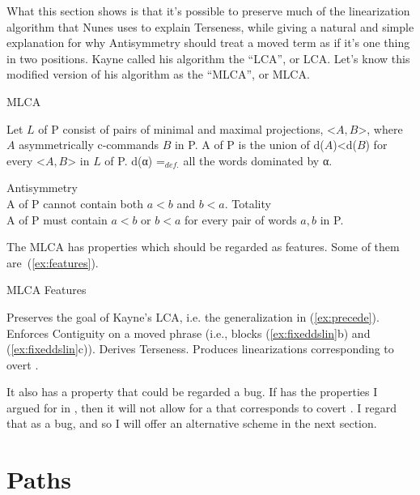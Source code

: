 \documentclass[output=paper]{langsci/langscibook}
\begin{document}
What this section shows is that it's possible to preserve much of the
linearization algorithm that Nunes uses to explain Terseness, while giving a
natural and simple explanation for why Antisymmetry should treat a moved term
as if it's one thing in two positions. Kayne called his  algorithm
the \enquote{\glsdesc{LCA}}, or \gls{LCA}. Let's know this modified
version of his algorithm as the \enquote{\glsdesc{MLCA}}, or
\gls{MLCA}.

\begin{exe}
    \ex \label{ex:mlca} \gls{MLCA}
	\begin{xlist}
		\ex Let $L$ of P consist of pairs of minimal and maximal projections, <$A,B$>, where $A$ asymmetrically c-commands $B$ in P.
		\ex A  of P is the union of d($A$)<d($B$) for every <$A,B$> in $L$ of P.
        \ex d(α) =$_{def.}$ all the words dominated by α.
	\end{xlist}
	\ex Antisymmetry\\
	A  of P cannot contain both $a<b$ and $b<a$.
	\ex Totality\\
	A  of P must contain $a<b$ or $b<a$ for every pair of words $a,b$ in P.
\end{exe}

The \gls{MLCA} has properties which should be regarded as features. Some of them are~(\ref{ex:features}).
\begin{exe}
	\ex \label{ex:features} \gls{MLCA} Features
	\begin{xlist}
        \ex Preserves the goal of Kayne's \gls{LCA}, i.e. the generalization in (\ref{ex:precede}).
		\ex Enforces Contiguity on a moved phrase (i.e., blocks (\ref{ex:fixeddslin}b) and (\ref{ex:fixeddslin}c)).
		\ex Derives Terseness.
		\ex Produces linearizations corresponding to overt \isi{movement}.
	\end{xlist}
\end{exe}

It also has a property that could be regarded a bug. If  has the properties I argued for in \citet{Johnson2012}, then it will not allow for a  that corresponds to covert . I regard that as a bug, and so I will offer an alternative  scheme in the next section.


\section{Paths} %
\label{sec:paths}
\end{document}

